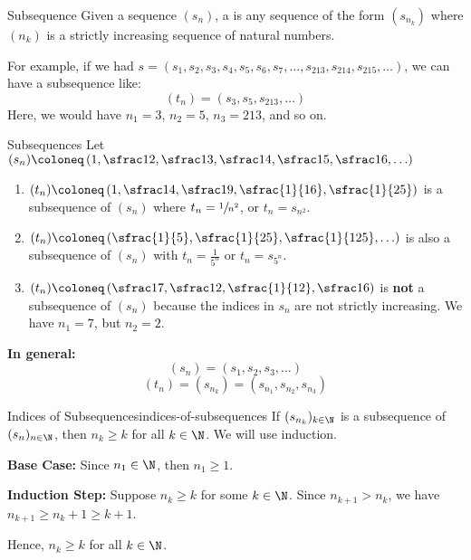 \begin{dfnbox}{Subsequence}{}
    Given a sequence $(s_n)$, a  is any sequence of the form $(s_{n_k})$ where $(n_k)$ is a strictly increasing sequence of natural numbers.
\end{dfnbox}

For example, if we had $s = (s_1, s_2, s_3, s_4, s_5, s_6, s_7, \ldots, s_{213}, s_{214}, s_{215}, \ldots)$, we can have a subsequence like:
\[ (t_n) = (s_3, s_5, s_{213}, \ldots) \]
Here, we would have $n_1 = 3$, $n_2 = 5$, $n_3 = 213$, and so on.

\begin{exbox}{Subsequences}{}
    Let $(s_n) \coloneq \left( 1, \sfrac12, \sfrac13, \sfrac14, \sfrac15, \sfrac16, \ldots \right)$
    \begin{enumerate}
        \item $(t_n) \coloneq \left( 1, \sfrac14, \sfrac19, \sfrac{1}{16}, \sfrac{1}{25} \right)$ is a subsequence of $(s_n)$ where $t_n = \sfrac{1}{n^2}$, or $t_n = s_{n^2}$.
        \item $(t_n) \coloneq \left( \sfrac{1}{5}, \sfrac{1}{25}, \sfrac{1}{125}, \ldots \right)$ is also a subsequence of $(s_n)$ with $t_n = \frac{1}{5^n}$ or $t_n = s_{5^n}$.
        \item $(t_n) \coloneq \left( \sfrac17, \sfrac12, \sfrac{1}{12}, \sfrac16 \right)$ is \textbf{not} a subsequence of $(s_n)$ because the indices in $s_n$ are not strictly increasing. We have $n_1 = 7$, but $n_2 = 2$.
    \end{enumerate}
\end{exbox}

\begin{notebox}
    \textbf{In general:}
    \[ (s_n) = (s_1, s_2, s_3, \ldots) \]
    \[ (t_n) = (s_{n_k}) = (s_{n_1}, s_{n_2}, s_{n_3}) \]
\end{notebox}

\begin{lembox}{Indices of Subsequences}{indices-of-subsequences}
    If $(s_{n_k})_{k \in \N}$ is a subsequence of $(s_n)_{n \in \N}$, then $n_k \geq k$ for all $k \in \N$.
    \tcblower
    We will use induction.

    \textbf{Base Case:} Since $n_1 \in \N$, then $n_1 \geq 1$.

    \textbf{Induction Step:} Suppose $n_k \geq k$ for some $k \in \N$. Since $n_{k+1} > n_k$, we have $n_{k+1} \geq n_k + 1 \geq k + 1$.

    Hence, $n_k \geq k$ for all $k \in \N$.
\end{lembox}

